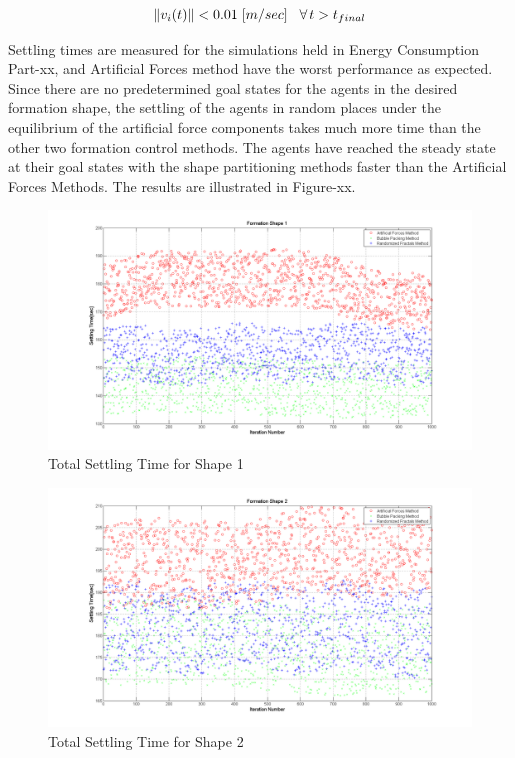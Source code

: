 \documentclass[twoside]{article}
\newcommand{\norm}[1]{\left\lVert#1\right\rVert}
\begin{document}
		\begin{equation}
\norm{v_i(t)} < 0.01 \hspace{0.1cm} [m/sec] \hspace{0.3cm}\forall\hspace{0.05cm} t>t_{final}
		\end{equation}
		
		Settling times are measured for the simulations held in Energy Consumption Part-xx, and Artificial Forces method have the worst performance as expected. Since there are no predetermined goal states for the agents in the desired formation shape, the settling of the agents in random places under the equilibrium of the artificial force components takes much more time than the other two formation control methods. The agents have reached the steady state at their goal states with the shape partitioning methods faster than the Artificial Forces Methods. The results are illustrated in Figure-xx.
		
		   \begin{figure}[H]
		   	\caption{Total Settling Time for Shape 1}
		   	\centerline{\includegraphics[scale = 0.35]{Total_Time_Shape_1}}
		   \end{figure} 
		
		 \begin{figure}[H]
		 	\caption{Total Settling Time for Shape 2}
		 	\centerline{\includegraphics[scale = 0.35]{Total_Time_Shape_2}}
		 \end{figure} 
		 
\end{document}
